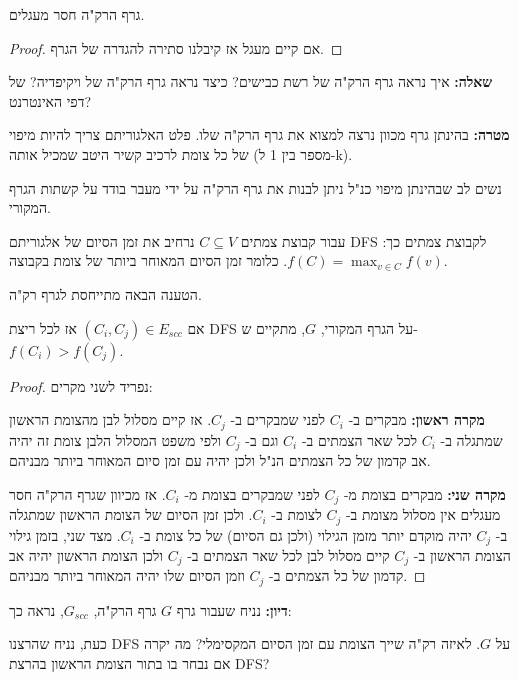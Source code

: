 \begin{observation}
גרף הרק"ה חסר מעגלים.
\end{observation}
\begin{proof}
אם קיים מעגל אז קיבלנו סתירה להגדרה של הגרף.

\end{proof}

\textbf{שאלה:}
איך נראה גרף הרק"ה של רשת כבישים? כיצד נראה גרף הרק"ה של ויקיפדיה? של דפי האינטרנט?

\textbf{מטרה:}
בהינתן גרף מכוון נרצה למצוא את גרף הרק"ה שלו.
פלט האלגוריתם צריך להיות מיפוי של כל צומת לרכיב קשיר היטב שמכיל אותה (מספר בין 1 ל-k).

נשים לב שבהינתן מיפוי כנ"ל ניתן לבנות את גרף הרק"ה על ידי מעבר בודד על קשתות הגרף המקורי.



עבור קבוצת צמתים
$C \subseteq V$
נרחיב את זמן הסיום של אלגוריתם
\textenglish{DFS}
לקבוצת צמתים כך:
$f(C) = \max_{v \in C}f(v)$.
כלומר זמן הסיום המאוחר ביותר של צומת בקבוצה.


הטענה הבאה מתייחסת לגרף רק"ה.
\begin{claim}
אם
$(C_i,C_j) \in E_{scc}$
אז לכל ריצת 
\textenglish{DFS}
על הגרף המקורי, $G$, מתקיים ש-%
$f(C_i) > f(C_j)$.
\end{claim}

\begin{proof}
נפריד לשני מקרים:

\textbf{מקרה ראשון:}
מבקרים ב-%
$C_i$
לפני שמבקרים ב-%
$C_j$.
אז קיים מסלול לבן מהצומת הראשון שמתגלה ב-%
$C_i$
לכל שאר הצמתים ב-%
$C_i$
וגם ב-%
$C_j$
ולפי משפט המסלול הלבן צומת זה יהיה אב קדמון של כל הצמתים הנ"ל ולכן יהיה עם זמן סיום המאוחר 
ביותר מבניהם.

\textbf{מקרה שני:}
מבקרים בצומת מ-%
$C_j$
לפני שמבקרים בצומת מ-%
$C_i$.
אז מכיוון שגרף הרק"ה חסר מעגלים אין מסלול מצומת ב-%
$C_j$
לצומת ב-%
$C_i$.
ולכן זמן הסיום של הצומת הראשון שמתגלה ב-%
$C_j$
יהיה מוקדם יותר מזמן הגילוי (ולכן גם הסיום) של כל צומת ב-%
$C_i$.
מצד שני, בזמן גילוי הצומת הראשון ב-%
$C_j$
קיים מסלול לבן לכל שאר הצמתים ב-%
$C_j$
ולכן הצומת הראשון יהיה אב קדמון של כל הצמתים ב-%
$C_j$
וזמן הסיום שלו יהיה המאוחר ביותר מבניהם.
\end{proof}

\textbf{דיון:}
נניח שעבור גרף $G$ גרף הרק"ה,
$G_{scc}$,
נראה כך:
\begin{center}
\end{center}
כעת, נניח שהרצנו
\textenglish{DFS}
על $G$.
לאיזה רק"ה שייך הצומת עם זמן הסיום המקסימלי? 
מה יקרה אם נבחר בו בתור הצומת הראשון בהרצת
\textenglish{DFS}?


